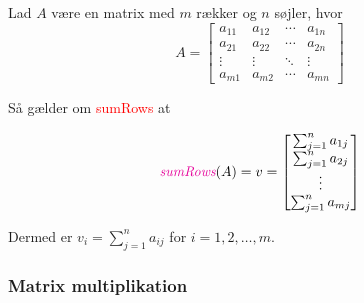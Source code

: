 \vspace{0.5cm}
\begin{definition} \label{sumRows}
Lad $A$ være en matrix med $m$ rækker og $n$ søjler, hvor
\[
A = \begin{bmatrix}
a_{11} & a_{12} & \cdots & a_{1n} \\
a_{21} & a_{22} & \cdots & a_{2n} \\
\vdots & \vdots & \ddots & \vdots \\
a_{m1} & a_{m2} & \cdots & a_{mn}
\end{bmatrix}
\]

Så gælder om \textcolor{red}{sumRows} at

\[
\textit{\textcolor{red}{sumRows}}(A) =
v = \begin{bmatrix}
\sum_{j=1}^{n} a_{1j} \\
\sum_{j=1}^{n} a_{2j} \\
\vdots \\
\sum_{j=1}^{n} a_{mj}
\end{bmatrix}
\]

Dermed er $v_i = \sum_{j=1}^{n} a_{ij}$ for $i = 1, 2, \ldots, m$.
\end{definition}

\subsubsection{Matrix multiplikation}


